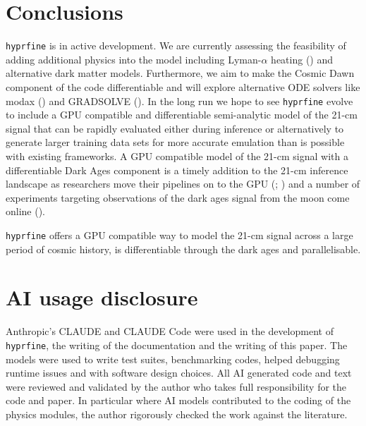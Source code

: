 \documentclass[
]{article}
\begin{document}
\section{Conclusions}\label{conclusions}

\texttt{hyprfine} is in active development. We are currently assessing
the feasibility of adding additional physics into the model including
Lyman-\(\alpha\) heating () and alternative dark matter models. Furthermore, we aim to
make the Cosmic Dawn component of the code differentiable and will
explore alternative ODE solvers like modax
() and GRADSOLVE
(). In
the long run we hope to see \texttt{hyprfine} evolve to include a GPU
compatible and differentiable semi-analytic model of the 21-cm signal
that can be rapidly evaluated either during inference or alternatively
to generate larger training data sets for more accurate emulation than
is possible with existing frameworks. A GPU compatible model of the
21-cm signal with a differentiable Dark Ages component is a timely
addition to the 21-cm inference landscape as researchers move their
pipelines on to the GPU (; )
and a number of experiments targeting observations of the dark ages
signal from the moon come online ().

\texttt{hyprfine} offers a GPU compatible way to model the 21-cm signal
across a large period of cosmic history, is differentiable through the
dark ages and parallelisable.

\section{AI usage disclosure}\label{ai-usage-disclosure}

Anthropic's CLAUDE and CLAUDE Code were used in the development of
\texttt{hyprfine}, the writing of the documentation and the writing of
this paper. The models were used to write test suites, benchmarking
codes, helped debugging runtime issues and with software design choices.
All AI generated code and text were reviewed and validated by the author
who takes full responsibility for the code and paper. In particular
where AI models contributed to the coding of the physics modules, the
author rigorously checked the work against the literature.
\end{document}
